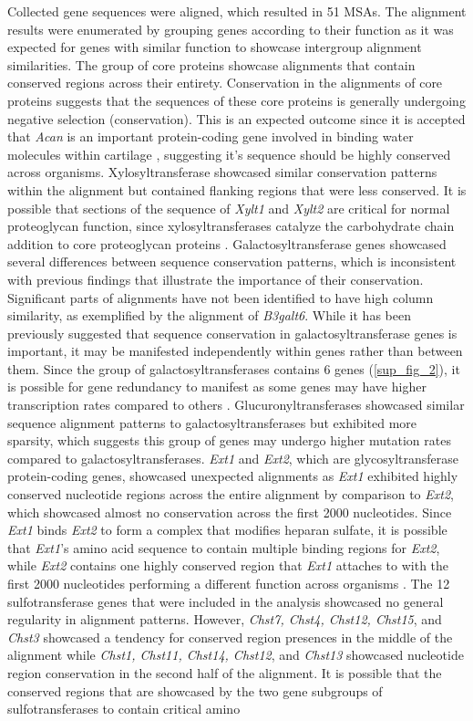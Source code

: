\documentclass{article}
\begin{document}
Collected gene sequences were aligned, which resulted in 51 MSAs. The alignment results were enumerated by grouping genes according to their function as it was expected for genes with similar function to showcase intergroup alignment similarities. The group of core proteins showcase alignments that contain conserved regions across their entirety. Conservation in the alignments of core proteins suggests that the sequences of these core proteins is generally undergoing negative selection (conservation). This is an expected outcome since it is accepted that \textit{Acan} is an important protein-coding gene involved in binding water molecules within cartilage \cite{proteo_osteo1}, suggesting it's sequence should be highly conserved across organisms. Xylosyltransferase showcased similar conservation patterns within the alignment but contained flanking regions that were less conserved. It is possible that sections of the sequence of \textit{Xylt1} and \textit{Xylt2} are critical for normal proteoglycan function, since xylosyltransferases catalyze the carbohydrate chain addition to core proteoglycan proteins \cite{xylt}. Galactosyltransferase genes showcased several differences between sequence conservation patterns, which is inconsistent with previous findings that illustrate the importance of their conservation. Significant parts of alignments have not been identified to have high column similarity, as exemplified by the alignment of \textit{B3galt6}. While it has been previously suggested that sequence conservation in galactosyltransferase genes is important, it may be manifested independently within genes rather than between them. Since the group of galactosyltransferases contains 6 genes (\ref{sup_fig_2}), it is possible for gene redundancy to manifest as some genes may have higher transcription rates compared to others \cite{galt}. Glucuronyltransferases showcased similar sequence alignment patterns to galactosyltransferases but exhibited more sparsity, which suggests this group of genes may undergo higher mutation rates compared to galactosyltransferases. \textit{Ext1} and \textit{Ext2}, which are glycosyltransferase protein-coding genes, showcased unexpected alignments as \textit{Ext1} exhibited highly conserved nucleotide regions across the entire alignment by comparison to \textit{Ext2}, which showcased almost no conservation across the first 2000 nucleotides. Since \textit{Ext1} binds \textit{Ext2} to form a complex that modifies heparan sulfate, it is possible that \textit{Ext1}'s amino acid sequence to contain multiple binding regions for \textit{Ext2}, while \textit{Ext2} contains one highly conserved region that \textit{Ext1} attaches to with the first 2000 nucleotides performing a different function across organisms \cite{ext}. The 12 sulfotransferase genes that were included in the analysis showcased no general regularity in alignment patterns. However, \textit{Chst7, Chst4, Chst12, Chst15}, and \textit{Chst3} showcased a tendency for conserved region presences in the middle of the alignment while \textit{Chst1, Chst11, Chst14, Chst12}, and \textit{Chst13} showcased nucleotide region conservation in the second half of the alignment. It is possible that the conserved regions that are showcased by the two gene subgroups of sulfotransferases to contain critical amino 
\end{document}
